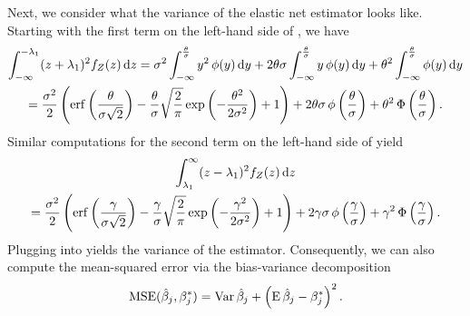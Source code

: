 Next, we consider what the variance of the elastic net estimator looks like.
Starting with the first term on the left-hand side of , we have
\begin{multline}
  \label{eq:mc-var-part1}
  \int_{-\infty}^{-\lambda_1}(z+ \lambda_1)^2 f_Z(z) \mathop{}\!\mathrm{d} z = \sigma^2 \int_{-\infty}^{\frac{\theta}{\sigma}} y^2 \operatorname{\phi}(y) \mathop{}\!\mathrm{d} y + 2 \theta \sigma \int_{-\infty}^{\frac{\theta}{\sigma}} y \operatorname{\phi}(y) \mathop{}\!\mathrm{d} y + \theta^2 \int_{-\infty}^{\frac{\theta}{\sigma}} \operatorname{\phi}(y) \mathop{}\!\mathrm{d} y \\
  = \frac{\sigma^2}{2} \left( \operatorname{erf}\left(\frac{\theta}{\sigma\sqrt{2}}\right) - \frac{\theta}{\sigma}\sqrt{\frac{2}{\pi}} \exp\left(-\frac{\theta^2}{2\sigma^2}\right) + 1 \right) + 2 \theta \sigma \operatorname{\phi} \left(\frac{\theta}{\sigma}\right) + \theta^2 \operatorname{\Phi}\left(\frac{\theta}{\sigma}\right).
\end{multline}
Similar computations for the second term on the left-hand side of  yield
\begin{multline}
  \label{eq:mc-var-part2}
  \int_{\lambda_1}^{\infty}(z - \lambda_1)^2 f_Z(z) \mathop{}\!\mathrm{d} z \\
  = \frac{\sigma^2}{2} \left( \operatorname{erf}\left(\frac{\gamma}{\sigma\sqrt{2}}\right) - \frac{\gamma}{\sigma}\sqrt{\frac{2}{\pi}} \exp\left(-\frac{\gamma^2}{2\sigma^2}\right) + 1 \right) + 2 \gamma \sigma \operatorname{\phi} \left(\frac{\gamma}{\sigma}\right) + \gamma^2 \operatorname{\Phi}\left(\frac{\gamma}{\sigma}\right).
\end{multline}
Plugging  into  yields the variance of the estimator. Consequently, we can also compute the mean-squared error via the bias-variance decomposition
\begin{equation}
  \label{eq:betahat-mse}
  \operatorname{MSE} (\hat\beta_j, \beta^*_j) = \operatorname{Var}\hat\beta_j + \left(\operatorname{E} \hat\beta_j - \beta^*_j\right)^2.
\end{equation}


